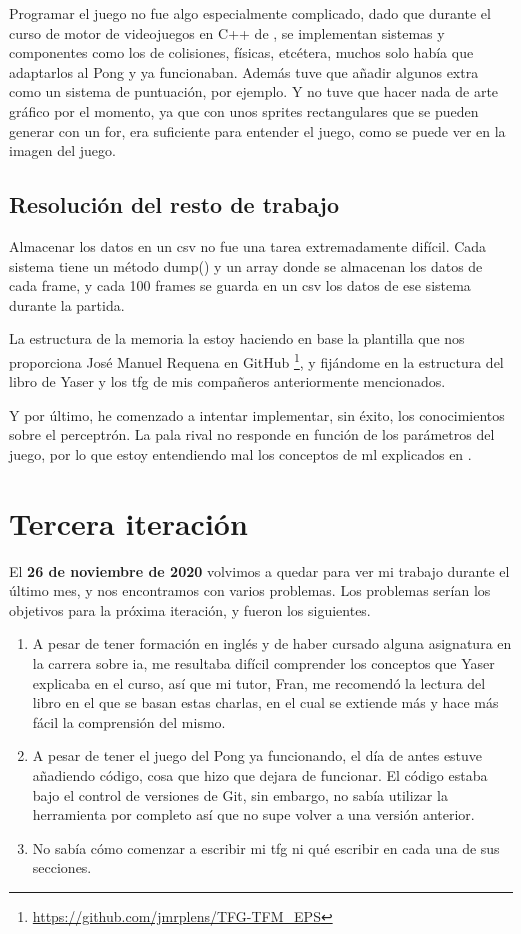 Programar el juego no fue algo especialmente complicado, dado que durante el curso de motor de videojuegos en C++ de , se implementan sistemas y componentes como los de colisiones, físicas, etcétera, muchos solo había que adaptarlos al Pong y ya funcionaban. Además tuve que añadir algunos extra como un sistema de puntuación, por ejemplo. Y no tuve que hacer nada de arte gráfico por el momento, ya que con unos sprites rectangulares que se pueden generar con un for, era suficiente para entender el juego, como se puede ver en la imagen del juego.

\subsection{Resolución del resto de trabajo}
Almacenar los datos en un \gls{csv} no fue una tarea extremadamente difícil. Cada sistema tiene un método dump() y un array donde se almacenan los datos de cada frame, y cada 100 frames se guarda en un \gls{csv} los datos de ese sistema durante la partida.

La estructura de la memoria la estoy haciendo en base la plantilla que nos proporciona José Manuel Requena en GitHub \footnote{\url{https://github.com/jmrplens/TFG-TFM\_EPS}}, y fijándome en la estructura del libro de Yaser y los \gls{tfg} de mis compañeros anteriormente mencionados.

Y por último, he comenzado a intentar implementar, sin éxito, los conocimientos sobre el perceptrón. La pala rival no responde en función de los parámetros del juego, por lo que estoy entendiendo mal los conceptos de \gls{ml} explicados en \citep{LearningFromData}. 

\section{Tercera iteración}
El \textbf{26 de noviembre de 2020} volvimos a quedar para ver mi trabajo durante el último mes, y nos encontramos con varios problemas. Los problemas serían los objetivos para la próxima iteración, y fueron los siguientes.

\begin{enumerate}
	\item A pesar de tener formación en inglés y de haber cursado alguna asignatura en la carrera sobre \gls{ia}, me resultaba difícil comprender los conceptos que Yaser explicaba en el curso, así que mi tutor, Fran, me recomendó la lectura del libro en el que se basan estas charlas, en el cual se extiende más y hace más fácil la comprensión del mismo.
	\item A pesar de tener el juego del Pong ya funcionando, el día de antes estuve añadiendo código, cosa que hizo que dejara de funcionar. El código estaba bajo el control de versiones de Git, sin embargo, no sabía utilizar la herramienta por completo así que no supe volver a una versión anterior.
	\item No sabía cómo comenzar a escribir mi \gls{tfg} ni qué escribir en cada una de sus secciones.
\end{enumerate}

